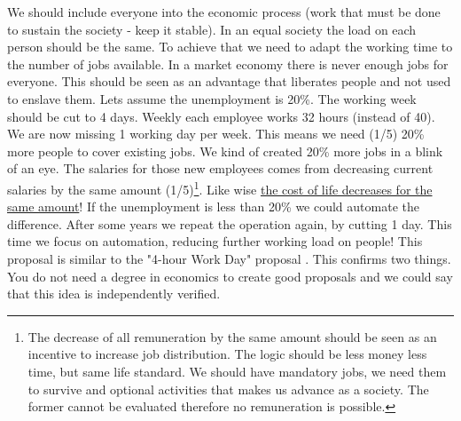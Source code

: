 \documentclass{article}
\begin{document}
We should include everyone into the economic process (work that must be done to sustain the society - keep it stable).
In an equal society the load on each person should be the same.
To achieve that we need to adapt the working time to the number of jobs available.
In a market economy there is never enough jobs for everyone.
This should be seen as an advantage that liberates people and not used to enslave them.
Lets assume the unemployment is 20\%.
The working week should be cut to 4 days.
Weekly each employee works 32 hours (instead of 40).
We are now missing 1 working day per week.
This means we need (1/5) 20\% more people to cover existing jobs.
We kind of created 20\% more jobs in a blink of an eye.
The salaries for those new employees comes from decreasing current salaries by the same amount (1/5)\footnote{The decrease of all remuneration by the same amount should be seen as an incentive to increase job distribution. The logic should be less money less time, but same life standard. We should have mandatory jobs, we need them to survive and optional activities that makes us advance as a society. The former cannot be evaluated therefore no remuneration is possible.}.
Like wise \underline{the cost of life decreases for the same amount}!
If the unemployment is less than 20\% we could automate the difference.
After some years we repeat the operation again, by cutting 1 day.
This time we focus on automation, reducing further working load on people!
This proposal is similar to the "4-hour Work Day" proposal \cite{4hourday}.
This confirms two things.
You do not need a degree in economics to create good proposals and we could say that this idea is independently verified.
\end{document}
